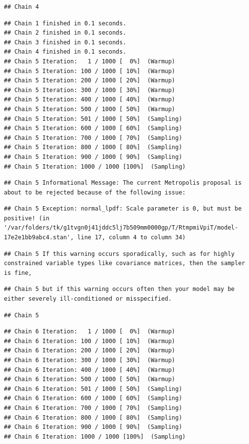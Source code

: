 \documentclass[
]{book}
\begin{document}
\begin{verbatim}
## Chain 4
\end{verbatim}

\begin{verbatim}
## Chain 1 finished in 0.1 seconds.
## Chain 2 finished in 0.1 seconds.
## Chain 3 finished in 0.1 seconds.
## Chain 4 finished in 0.1 seconds.
## Chain 5 Iteration:   1 / 1000 [  0%]  (Warmup) 
## Chain 5 Iteration: 100 / 1000 [ 10%]  (Warmup) 
## Chain 5 Iteration: 200 / 1000 [ 20%]  (Warmup) 
## Chain 5 Iteration: 300 / 1000 [ 30%]  (Warmup) 
## Chain 5 Iteration: 400 / 1000 [ 40%]  (Warmup) 
## Chain 5 Iteration: 500 / 1000 [ 50%]  (Warmup) 
## Chain 5 Iteration: 501 / 1000 [ 50%]  (Sampling) 
## Chain 5 Iteration: 600 / 1000 [ 60%]  (Sampling) 
## Chain 5 Iteration: 700 / 1000 [ 70%]  (Sampling) 
## Chain 5 Iteration: 800 / 1000 [ 80%]  (Sampling) 
## Chain 5 Iteration: 900 / 1000 [ 90%]  (Sampling) 
## Chain 5 Iteration: 1000 / 1000 [100%]  (Sampling)
\end{verbatim}

\begin{verbatim}
## Chain 5 Informational Message: The current Metropolis proposal is about to be rejected because of the following issue:
\end{verbatim}

\begin{verbatim}
## Chain 5 Exception: normal_lpdf: Scale parameter is 0, but must be positive! (in '/var/folders/tk/g1tvgn0j41jddc5lj7b509mm0000gp/T/RtmpmiVpiT/model-17e2e1bb9abc4.stan', line 17, column 4 to column 34)
\end{verbatim}

\begin{verbatim}
## Chain 5 If this warning occurs sporadically, such as for highly constrained variable types like covariance matrices, then the sampler is fine,
\end{verbatim}

\begin{verbatim}
## Chain 5 but if this warning occurs often then your model may be either severely ill-conditioned or misspecified.
\end{verbatim}

\begin{verbatim}
## Chain 5
\end{verbatim}

\begin{verbatim}
## Chain 6 Iteration:   1 / 1000 [  0%]  (Warmup) 
## Chain 6 Iteration: 100 / 1000 [ 10%]  (Warmup) 
## Chain 6 Iteration: 200 / 1000 [ 20%]  (Warmup) 
## Chain 6 Iteration: 300 / 1000 [ 30%]  (Warmup) 
## Chain 6 Iteration: 400 / 1000 [ 40%]  (Warmup) 
## Chain 6 Iteration: 500 / 1000 [ 50%]  (Warmup) 
## Chain 6 Iteration: 501 / 1000 [ 50%]  (Sampling) 
## Chain 6 Iteration: 600 / 1000 [ 60%]  (Sampling) 
## Chain 6 Iteration: 700 / 1000 [ 70%]  (Sampling) 
## Chain 6 Iteration: 800 / 1000 [ 80%]  (Sampling) 
## Chain 6 Iteration: 900 / 1000 [ 90%]  (Sampling) 
## Chain 6 Iteration: 1000 / 1000 [100%]  (Sampling)
\end{verbatim}
\end{document}
